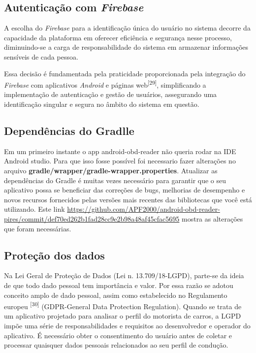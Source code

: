     \subsection{Autenticação com \textit{Firebase}}

    A  escolha do \textit{Firebase} para a identificação única do usuário no sistema decorre da capacidade da plataforma em oferecer eficiência e segurança nesse processo, diminuindo-se a carga de responsabilidade do sistema em armazenar informações sensíveis de cada pessoa. 
    
    Essa decisão é fundamentada pela praticidade proporcionada pela integração do \textit{Firebase} com aplicativos \textit{Android} e páginas web\textsuperscript{[29]}, simplificando a implementação de autenticação e gestão de usuários, assegurando uma identificação singular e segura no âmbito do sistema em questão.

    \subsection{Dependências do Gradlle}

    Em um primeiro instante o app android-obd-reader não queria rodar na IDE Android studio. Para que isso fosse possível foi necessario fazer alterações no arquivo \textbf{gradle/wrapper/gradle-wrapper.properties}. Atualizar as dependências do Gradle  é muitas vezes necessário para garantir que o seu aplicativo possa se beneficiar das correções de bugs, melhorias de desempenho e novos recursos fornecidos pelas versões mais recentes das bibliotecas que você está utilizando. Este link \url{https://github.com/APF2000/android-obd-reader-pires/commit/def70ed262b1fad28cc9e2b98a48af45cfac5695} mostra as alterações que foram necessárias.

    \subsection{Proteção dos dados}
    
    Na Lei Geral de Proteção de Dados (Lei n. 13.709/18-LGPD), parte-se da ideia de que todo dado pessoal tem importância e valor. Por essa razão se adotou conceito amplo de dado pessoal, assim como estabelecido no Regulamento europeu \textsuperscript{[30]} (GDPR-General Data Protection  Regulation). Quando se trata de um aplicativo projetado para analisar o perfil do motorista de carros, a LGPD impõe uma série de responsabilidades e requisitos ao desenvolvedor e operador do aplicativo. É necessário obter o consentimento  do usuário antes de coletar e processar quaisquer dados pessoais relacionados ao seu perfil de condução.
    
